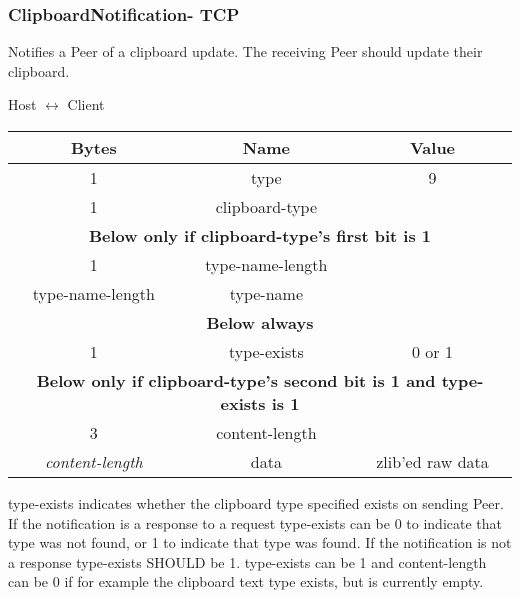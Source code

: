 \subsubsection{ClipboardNotification- TCP}

Notifies a Peer of a clipboard update. The receiving Peer should update their clipboard.

\begin{center}
    Host $\leftrightarrow$ Client\\
    \begin{tabular}{|c|c|c|}
        \hline
        \textbf{Bytes}        & \textbf{Name}    & \textbf{Value}   \\
        \hline
        1                     & type             & 9                \\
        \hline
        1                     & clipboard-type   &                  \\
        \hline
        \multicolumn{3}{|c|}{\textbf{Below only if clipboard-type's first bit is 1} } \\
        \hline
        1                     & type-name-length &                  \\
        \hline
        type-name-length      & type-name        &                  \\
        \hline
        \multicolumn{3}{|c|}{\textbf{Below always} } \\
        \hline
        1                     & type-exists      & 0 or 1           \\
        \hline
        \multicolumn{3}{|c|}{\textbf{Below only if clipboard-type's second bit is 1 and type-exists is 1} } \\
        \hline
        3                     & content-length   &                  \\
        \hline
        \emph{content-length} & data             & zlib'ed raw data \\
        \hline
    \end{tabular}
\end{center}

type-exists indicates whether the clipboard type specified exists on sending Peer.
If the notification is a response to a request type-exists can be 0 to indicate that type was not found, or 1 to indicate that type was found.
If the notification is not a response type-exists SHOULD be 1.
type-exists can be 1 and content-length can be 0 if for example the clipboard text type exists, but is currently empty.

